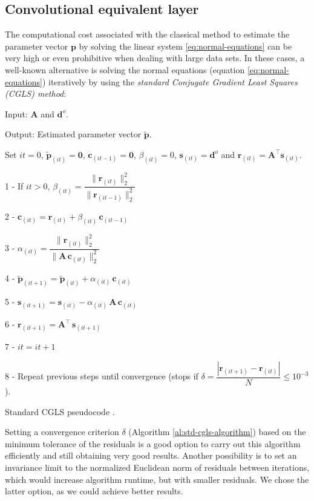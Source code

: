 \documentclass[manuscript,noblind]{geophysics}
\begin{document}
\subsection{Convolutional equivalent layer}

The computational cost associated with the classical method to estimate the parameter 
vector $\mathbf{p}$ by solving the linear system \ref{eq:normal-equations} can be very high 
or even prohibitive when dealing with large data sets. In these cases, a well-known alternative
is solving the normal equations (equation \ref{eq:normal-equations}) iteratively by 
using the \textit{standard Conjugate Gradient Least Squares (CGLS) method}:

\begin{algorithm}[H]
	Input: $\mathbf{A}$ and $\mathbf{d}^{o}$.
	
	Output: Estimated parameter vector $\tilde{\mathbf{p}}$.
	
	Set $it = 0$, $\tilde{\mathbf{p}}_{(it)} = \mathbf{0}$, $\mathbf{c}_{(it-1)} = \mathbf{0}$, $\beta_{(it)} = 0$, $\mathbf{s}_{(it)} = \mathbf{d}^{o}$ and $\mathbf{r}_{(it)} = \mathbf{A}^{\top} \mathbf{s}_{(it)}$.
	
	1 - If $it > 0$, $\beta_{(it)} = \dfrac{\| \mathbf{r}_{(it)} \|_{2}^{2}}{\| \mathbf{r}_{(it - 1)} \|_{2}^{2}}$
	
	2 - $\mathbf{c}_{(it)} = \mathbf{r}_{(it)} + \beta_{(it)} \, \mathbf{c}_{(it - 1)}$
	
	3 - $\alpha_{(it)} = \dfrac{{\| \mathbf{r}_{(it)}\|_{2}^{2}}}{\| \mathbf{A} \, \mathbf{c}_{(it)} \|_{2}^{2}}$
	
	4 - $\tilde{\mathbf{p}}_{(it + 1)} = \tilde{\mathbf{p}}_{(it)} + \alpha_{(it)} \, \mathbf{c}_{(it)}$
	
	5 - $\mathbf{s}_{(it + 1)} = \mathbf{s}_{(it)} - \alpha_{(it)} \, \mathbf{A} \, \mathbf{c}_{(it)}$
	
	6 - $\mathbf{r}_{(it + 1)} = \mathbf{A}^{\top} \, \mathbf{s}_{(it + 1)}$
	
	7 - $it = it + 1$
	
	8 - Repeat previous steps until convergence (stops if $\delta = \dfrac{|\mathbf{r}_{(it + 1)} - \mathbf{r}_{(it)}|}{N} \leq 10^{-3}$).
	
	\caption{Standard CGLS pseudocode \citep[][ p. 166]{aster2019parameter}.}
	\label{al:std-cgls-algorithm}
\end{algorithm}

Setting a convergence criterion $\delta$ (Algorithm \ref{al:std-cgls-algorithm}) based on the minimum tolerance 
of the residuals is a good option to carry out this algorithm efficiently and still obtaining very good results. 
Another possibility is to set an invariance limit to the normalized Euclidean norm of residuals between iterations,
which would increase algorithm runtime, but with smaller residuals. 
We chose the latter option, as we could achieve better results.
\end{document}
